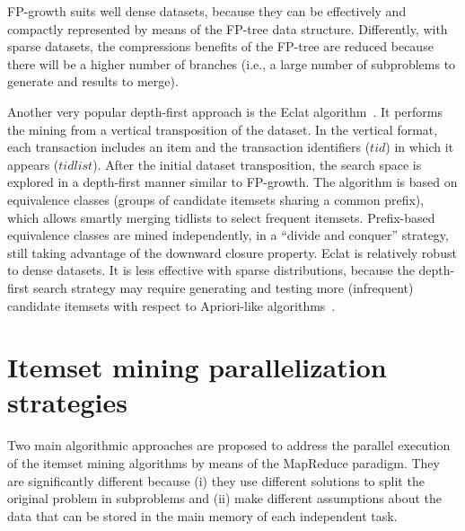 \documentclass[preprint,review,12pt]{elsarticle}
\begin{document}
FP-growth suits well dense datasets, because they can be effectively and compactly represented by means of the FP-tree data structure. Differently, with sparse datasets, the compressions benefits of the FP-tree are reduced because there will be a higher number of branches \cite{SurveyHan2007} (i.e., a large number of subproblems to generate and results to merge).

Another very popular depth-first approach is the Eclat algorithm~\cite{Zaki97newalgorithms}.
It performs the mining from a vertical
transposition of the dataset. In the vertical format, each transaction includes an item
and the transaction identifiers ($tid$) in which it appears ($tidlist$).
After the initial dataset
transposition, the search space is explored in a depth-first manner similar to
FP-growth. The algorithm is based on equivalence classes (groups of candidate itemsets
sharing a common prefix),  which allows smartly merging tidlists to select frequent itemsets. 
Prefix-based equivalence classes are mined independently, in a ``divide and conquer'' strategy, still
taking advantage of the downward closure property.
Eclat is relatively robust to dense datasets. It is less effective with sparse distributions, because the depth-first search strategy may require
generating and testing more (infrequent) candidate itemsets with respect to Apriori-like algorithms~\cite{vu2012mining}.



\section{Itemset mining parallelization strategies}
\label{parallelization}
Two main algorithmic approaches are proposed to address the parallel execution of the itemset mining algorithms by means of the MapReduce paradigm. 
They are significantly different because (i) they use different solutions to split the original problem in subproblems and (ii) make different assumptions about the data that can be stored in the main memory of each independent task. 
\end{document}

